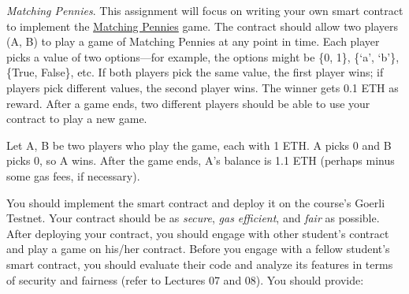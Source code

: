 \documentclass[12pt,addpoints,answers]{exam}
\begin{document}
\begin{questions}
\begin{parts}
\end{parts}

\newpage

 {\em Matching Pennies}. This assignment will focus on writing your own smart contract to implement the \href{https://en.wikipedia.org/wiki/Matching_pennies}{Matching Pennies} game. The contract should allow two players (A, B) to play a game of Matching Pennies at any point in time. Each player picks a value of two options---for example, the options might be \{0, 1\}, \{`a’, ‘b’\}, \{True, False\}, etc. If both players pick the same value, the first player wins; if players pick different values, the second player wins. The winner gets 0.1 ETH as reward. After a game ends, two different players should be able to use your contract to play a new game.

 Let A, B be two players who play the game, each with 1 ETH.  A picks 0 and B picks 0, so A wins. After the game ends, A’s balance is 1.1 ETH (perhaps minus some gas fees, if necessary).

You should implement the smart contract and deploy it on the course's Goerli Testnet.  Your contract should be as {\em secure}, {\em gas efficient}, and {\em fair} as possible. After deploying your contract, you should engage with other student's contract and play a game on his/her contract. Before you engage with a fellow student’s smart contract, you should evaluate their code and analyze its features in terms of security and fairness (refer to Lectures 07 and 08). You should provide:

\end{questions}
\end{document}
